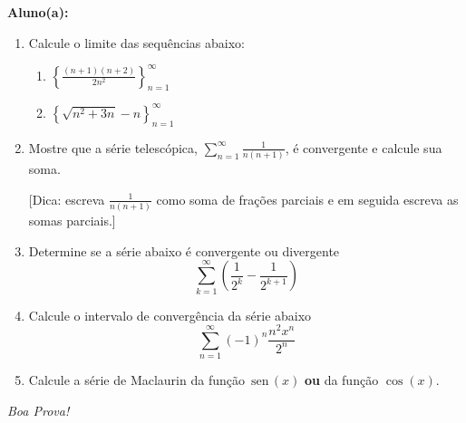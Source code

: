 \documentclass[a4paper,5pt]{amsbook}
\newcommand{\sen}{\,\mbox{sen}\,}
\newcommand{\ds}{\displaystyle}
\begin{document}
\vspace{0.5cm}
{\bf Aluno(a):}\dotfill{}  %

\vspace{0.2cm}
\begin{enumerate}
	\vspace{0.5cm}
	\item Calcule o limite das sequ\^encias abaixo:
		\begin{enumerate}
			\vspace{0.3cm}
			\item $\ds\left\{\frac{(n+1)(n+2)}{2n^2}\right\}_{n=1}^\infty$
			\vspace{0.3cm}
			\item $\ds \left\{\sqrt{n^2+3n} - n\right\}_{n=1}^\infty$
		\end{enumerate}

	\vspace{0.5cm}
	\item Mostre que a s\'erie telesc\'opica, $\ds \sum_{n=1}^\infty
		\frac{1}{n(n+1)}$, \'e convergente e calcule sua soma.

		\noindent{}[Dica: escreva $\ds\frac{1}{n(n+1)}$ como soma de
			fra\c{c}\~oes parciais e em seguida escreva as somas parciais.]

	\vspace{0.5cm}
	\item Determine se a s\'erie abaixo \'e convergente ou divergente
		\[\sum_{k=1}^\infty \left(\frac{1}{2^k} - \frac{1}{2^{k+1}}\right)\]

	\vspace{0.5cm}
	\item Calcule o intervalo de converg\^encia da s\'erie abaixo
		\[\sum_{n=1}^\infty (-1)^n \frac{n^2 x^n}{2^n}\]

	\vspace{0.5cm}
	\item Calcule a s\'erie de Maclaurin da fun\c{c}\~ao $\sen(x)$ \textbf{ou} da fun\c{c}\~ao
		$\cos(x)$.
\end{enumerate}

\vspace{1cm}
\begin{flushright}
	\textit{Boa Prova!}
\end{flushright}
\end{document}
